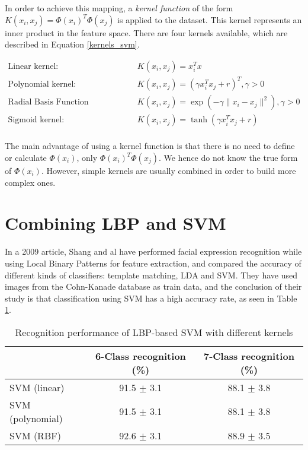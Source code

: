 \noindent In order to achieve this mapping, a \textit{kernel function} of the form $K(x_i, x_j) = \Phi(x_i)^T \Phi(x_j)$ is applied to the dataset. This kernel represents an inner product in the feature space. There are four kernels available, which are described in Equation \ref{kernels_svm}.
\newline

\begin{equation}
\begin{array}{ll}
	\text{Linear kernel:} & K(x_i,x_j) = x_i^Tx \\
	\text{Polynomial kernel:} & K(x_i,x_j) = (\gamma x_i^Tx_j + r)^T, \gamma > 0 \\
	\text{Radial Basis Function (Gaussian) kernel:} & K(x_i,x_j) = \exp(-\gamma \| x_i - x_j \|^2), \gamma > 0 \\
	\text{Sigmoid kernel:} & K(x_i,x_j) = \tanh(\gamma x_i^T x_j + r)\\
\end{array}
\label{kernels_svm}
\end{equation}

\vspace{\baselineskip}

\noindent The main advantage of using a kernel function is that there is no need to define or calculate $\Phi(x_i)$, only $\Phi(x_i)^T \Phi(x_j)$. We hence do not know the true form of $\Phi(x_i)$. However, simple kernels are usually combined in order to build more complex ones.
\newline

\section{Combining LBP and SVM}

\vspace{\baselineskip}
\noindent In a 2009 article, Shang and al \cite{SHA09} have performed facial expression recognition while using Local Binary Patterns for feature extraction, and compared the accuracy of different kinds of classifiers:  template matching,  LDA and SVM. They have used images from the Cohn-Kanade database as train data, and the conclusion of their study is that classification using SVM has a high accuracy rate, as seen in Table \ref{accuracy_svm_lbp}. 
\newline

\begin{table}[h]
\begin{tabular}{|lcc|}
\hline
 & 6-Class recognition (\%) &  7-Class recognition (\%) \\
 \hline
 SVM (linear) & 91.5 $\pm$ 3.1 & 88.1 $\pm$ 3.8 \\
 SVM (polynomial) & 91.5 $\pm$ 3.1 & 88.1 $\pm$ 3.8 \\
 SVM (RBF) & 92.6 $\pm$ 3.1 & 88.9 $\pm$ 3.5 \\
 \hline
\end{tabular}
\caption{\label{accuracy_svm_lbp} Recognition performance of LBP-based SVM with different kernels}
\end{table}

